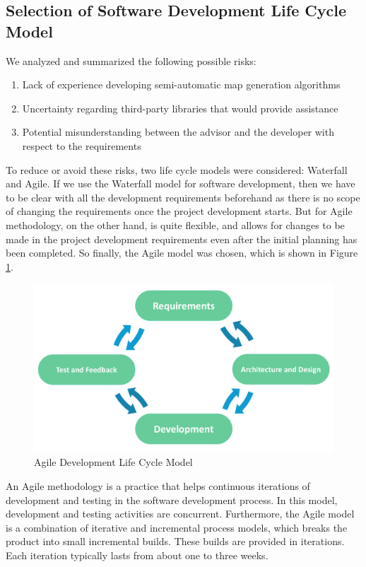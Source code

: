 \subsection{Selection of Software Development Life Cycle Model}
\label{sec:Requirements>SDLC}
We analyzed and summarized the following possible risks:
\begin{enumerate}
  \item Lack of experience developing semi-automatic map generation algorithms
  \item Uncertainty regarding third-party libraries that would provide assistance
  \item Potential misunderstanding between the advisor and the developer with respect to the requirements
\end{enumerate}

To reduce or avoid these risks, two life cycle models were considered: Waterfall and Agile. If we use the Waterfall model for software development, then we have to be clear with all the development requirements beforehand as there is no scope of changing the requirements once the project development starts. But for Agile methodology, on the other hand, is quite flexible, and allows for changes to be made in the project development requirements even after the initial planning has been completed. So finally, the Agile model was chosen, which is shown in Figure \ref{fig:Agile Model}.

\begin{figure}[htb]
\centering
\includegraphics[width=\textwidth]{section02/assets/Agile.png}
\caption[Agile Development Life Cycle Model]{\label{fig:Agile Model}Agile Development Life Cycle Model \cite{web:AgileModel}}
\end{figure}

An Agile methodology is a practice that helps continuous iterations of development and testing in the software development process. In this model, development and testing activities are concurrent. Furthermore, the Agile model is a combination of iterative and incremental process models, which breaks the product into small incremental builds. These builds are provided in iterations. Each iteration typically lasts from about one to three weeks.

